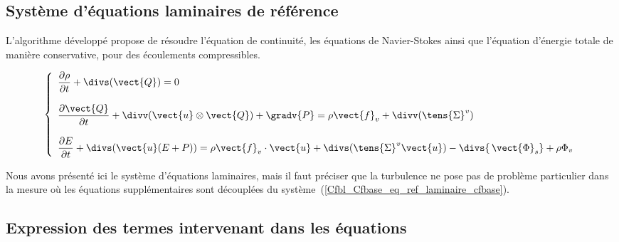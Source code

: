 \subsection*{Syst\`eme d'\'equations laminaires de r\'ef\'erence}

L'algorithme d\'evelopp\'e propose de r\'esoudre
l'\'equation de continuit\'e, les \'equations de Navier-Stokes
ainsi que l'\'equation d'\'energie totale de mani\`ere conservative,
pour des \'ecoulements compressibles.

\begin{equation}\label{Cfbl_Cfbase_eq_ref_laminaire_cfbase}
\left\{\begin{array}{l}

\displaystyle\frac{\partial\rho}{\partial t} + \divs(\vect{Q}) = 0 \\
\\
\displaystyle\frac{\partial\vect{Q}}{\partial t}
+ \divv(\vect{u} \otimes \vect{Q}) + \gradv{P}
= \rho \vect{f}_v + \divv(\tens{\Sigma}^v) \\
\\
\displaystyle\frac{\partial E}{\partial t} + \divs( \vect{u} (E+P) )
= \rho\vect{f}_v\cdot\vect{u} + \divs(\tens{\Sigma}^v \vect{u})
- \divs{\,\vect{\Phi}_s} + \rho\Phi_v

\end{array}\right.
\end{equation}

Nous avons présenté ici le système d'équations laminaires, mais il faut préciser
que la turbulence ne pose pas de problème particulier dans la mesure où les
équations suppl\'ementaires sont découplées du syst\`eme~(\ref{Cfbl_Cfbase_eq_ref_laminaire_cfbase}).

\subsection*{Expression des termes intervenant dans les \'equations}

